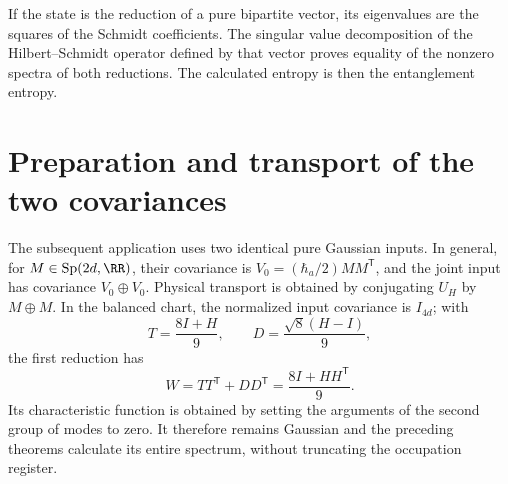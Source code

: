 If the state is the reduction of a pure bipartite vector, its
eigenvalues are the squares of the Schmidt coefficients.
The singular value decomposition of the Hilbert--Schmidt operator defined
by that vector proves equality of the nonzero spectra of both
reductions. The calculated entropy is then the entanglement entropy.

\section{Preparation and transport of the two covariances}
The subsequent application uses two identical pure Gaussian inputs.
In general, for \(M\in\operatorname{Sp}(2d,\RR)\), their covariance is
\(V_0=(\hbar_a/2)MM^{\mathsf T}\), and the joint input has
covariance \(V_0\oplus V_0\). Physical transport is obtained
by conjugating \(U_H\) by \(M\oplus M\). In the balanced chart,
the normalized input covariance is \(I_{4d}\); with
\[
 T=\frac{8I+H}{9},\qquad D=\frac{\sqrt8(H-I)}9,
\]
the first reduction has
\[
 W=TT^{\mathsf T}+DD^{\mathsf T}=\frac{8I+HH^{\mathsf T}}9.
\]
Its characteristic function is obtained by setting the arguments of the
second group of modes to zero. It therefore remains Gaussian and the preceding
theorems calculate its entire spectrum, without truncating the occupation register.
